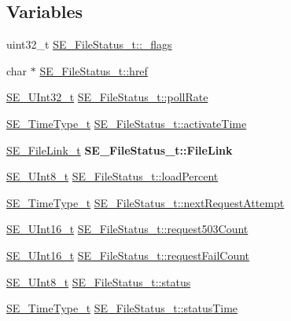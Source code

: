 \subsection*{Variables}
\begin{DoxyCompactItemize}
\item 
uint32\+\_\+t \hyperlink{group__FileStatus_ga4b3b27fbcfaf0fc19ac6bd5d54afd811}{S\+E\+\_\+\+File\+Status\+\_\+t\+::\+\_\+flags}
\item 
char $\ast$ \hyperlink{group__FileStatus_gab42569063c0f1f2ecbacadf94a84692b}{S\+E\+\_\+\+File\+Status\+\_\+t\+::href}
\item 
\hyperlink{group__UInt32_ga70bd4ecda3c0c85d20779d685a270cdb}{S\+E\+\_\+\+U\+Int32\+\_\+t} \hyperlink{group__FileStatus_ga84d473efe80699dab7000ebf8e072f81}{S\+E\+\_\+\+File\+Status\+\_\+t\+::poll\+Rate}
\item 
\hyperlink{group__TimeType_ga6fba87a5b57829b4ff3f0e7638156682}{S\+E\+\_\+\+Time\+Type\+\_\+t} \hyperlink{group__FileStatus_gaf741987e3e6783c64bf119b24dde669f}{S\+E\+\_\+\+File\+Status\+\_\+t\+::activate\+Time}
\item 
\mbox{\label{group__FileStatus_gad7c3e40aec562033c0335399fbdf6599}} 
\hyperlink{structSE__FileLink__t}{S\+E\+\_\+\+File\+Link\+\_\+t} {\bfseries S\+E\+\_\+\+File\+Status\+\_\+t\+::\+File\+Link}
\item 
\hyperlink{group__UInt8_gaf7c365a1acfe204e3a67c16ed44572f5}{S\+E\+\_\+\+U\+Int8\+\_\+t} \hyperlink{group__FileStatus_ga10c95c145e19e06b777320bf0a2dd354}{S\+E\+\_\+\+File\+Status\+\_\+t\+::load\+Percent}
\item 
\hyperlink{group__TimeType_ga6fba87a5b57829b4ff3f0e7638156682}{S\+E\+\_\+\+Time\+Type\+\_\+t} \hyperlink{group__FileStatus_gace8c5876bbb1939bc810eba9c41485a8}{S\+E\+\_\+\+File\+Status\+\_\+t\+::next\+Request\+Attempt}
\item 
\hyperlink{group__UInt16_gac68d541f189538bfd30cfaa712d20d29}{S\+E\+\_\+\+U\+Int16\+\_\+t} \hyperlink{group__FileStatus_gaac513ab0b825a0ca8dc8781afbd86fea}{S\+E\+\_\+\+File\+Status\+\_\+t\+::request503\+Count}
\item 
\hyperlink{group__UInt16_gac68d541f189538bfd30cfaa712d20d29}{S\+E\+\_\+\+U\+Int16\+\_\+t} \hyperlink{group__FileStatus_ga225fff3f05549ecacea2c1f2ce1b4776}{S\+E\+\_\+\+File\+Status\+\_\+t\+::request\+Fail\+Count}
\item 
\hyperlink{group__UInt8_gaf7c365a1acfe204e3a67c16ed44572f5}{S\+E\+\_\+\+U\+Int8\+\_\+t} \hyperlink{group__FileStatus_ga5ec878ed781a4fa3d9a7530017df562a}{S\+E\+\_\+\+File\+Status\+\_\+t\+::status}
\item 
\hyperlink{group__TimeType_ga6fba87a5b57829b4ff3f0e7638156682}{S\+E\+\_\+\+Time\+Type\+\_\+t} \hyperlink{group__FileStatus_ga07bc76971f8a0f26f8e5b1c62e6432e6}{S\+E\+\_\+\+File\+Status\+\_\+t\+::status\+Time}
\end{DoxyCompactItemize}


